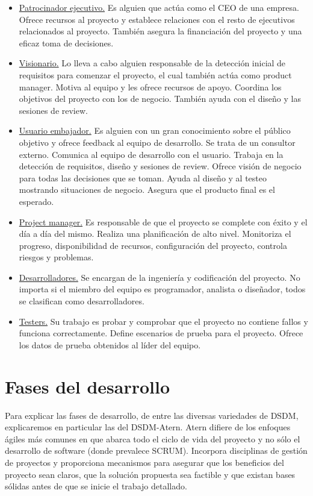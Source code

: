 \documentclass[12pt,a4paper]{article}
\begin{document}
\begin{itemize}
\item \underline{Patrocinador ejecutivo.} Es alguien que actúa como el CEO de una empresa. Ofrece recursos al proyecto y establece relaciones con el resto de ejecutivos relacionados al proyecto. También asegura la financiación del proyecto y una eficaz toma de decisiones.
\item \underline{Visionario.} Lo lleva a cabo alguien responsable de la detección inicial de requisitos para comenzar el proyecto, el cual también actúa como product manager. Motiva al equipo y les ofrece recursos de apoyo. Coordina los objetivos del proyecto con los de negocio.
También ayuda con el diseño y las sesiones de review.
\item \underline{Usuario embajador.} Es alguien con un gran conocimiento sobre el público objetivo y ofrece feedback al equipo de desarrollo. Se trata de un consultor externo. Comunica al equipo de desarrollo con el usuario. Trabaja en la detección de requisitos, diseño y sesiones de review. Ofrece visión de negocio para todas las decisiones que se toman. Ayuda al diseño y al testeo mostrando situaciones de negocio. Asegura que el producto final es el esperado.
\item \underline{Project manager.} Es responsable de que el proyecto se complete con éxito y el día a día del mismo. Realiza una planificación de alto nivel. Monitoriza el progreso, disponibilidad de recursos, configuración del proyecto, controla riesgos y problemas.
\item \underline{Desarrolladores.} Se encargan de la ingeniería y codificación del proyecto. No importa si el miembro del equipo es programador, analista o diseñador, todos se clasifican como desarrolladores.
\item \underline{Testers.} Su trabajo es probar y comprobar que el proyecto no contiene fallos y funciona correctamente. Define escenarios de prueba para el proyecto. Ofrece los datos de prueba obtenidos al líder del equipo.

\end{itemize}{}

\section{Fases del desarrollo}
Para explicar las fases de desarrollo, de entre las diversas variedades de DSDM, explicaremos en particular las del DSDM-Atern. Atern difiere de los enfoques ágiles más comunes en que abarca todo el ciclo de vida del proyecto y no sólo el desarrollo de software (donde prevalece SCRUM). Incorpora disciplinas de gestión de proyectos y proporciona mecanismos para asegurar que los beneficios del proyecto sean claros, que la solución propuesta sea factible y que existan bases sólidas antes de que se inicie el trabajo detallado.
\end{document}
